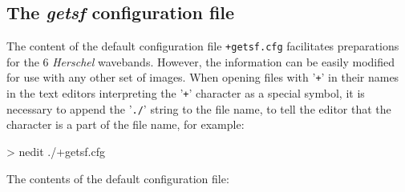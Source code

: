 \documentclass[a4paper,10pt]{article}
\begin{document}
\subsection{The \textsl{getsf} configuration file}
\label{config}

The content of the default configuration file \verb!+getsf.cfg! facilitates preparations for the 6 \emph{Herschel} wavebands.
However, the information can be easily modified for use with any other set of images. When opening files with '\verb!+!' in their
names in the text editors interpreting the '\verb!+!' character as a special symbol, it is necessary to append the '\verb!./!'
string to the file name, to tell the editor that the character is a part of the file name, for example:
\begin{verbnobox}[\mbox{}\small]
> nedit ./+getsf.cfg
\end{verbnobox}
The contents of the default configuration file:
\end{document}
